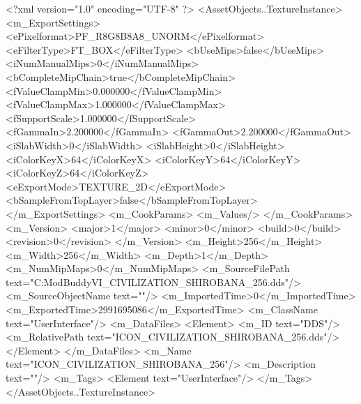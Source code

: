 <?xml version="1.0" encoding="UTF-8" ?>
<AssetObjects..TextureInstance>
	<m_ExportSettings>
		<ePixelformat>PF_R8G8B8A8_UNORM</ePixelformat>
		<eFilterType>FT_BOX</eFilterType>
		<bUseMips>false</bUseMips>
		<iNumManualMips>0</iNumManualMips>
		<bCompleteMipChain>true</bCompleteMipChain>
		<fValueClampMin>0.000000</fValueClampMin>
		<fValueClampMax>1.000000</fValueClampMax>
		<fSupportScale>1.000000</fSupportScale>
		<fGammaIn>2.200000</fGammaIn>
		<fGammaOut>2.200000</fGammaOut>
		<iSlabWidth>0</iSlabWidth>
		<iSlabHeight>0</iSlabHeight>
		<iColorKeyX>64</iColorKeyX>
		<iColorKeyY>64</iColorKeyY>
		<iColorKeyZ>64</iColorKeyZ>
		<eExportMode>TEXTURE_2D</eExportMode>
		<bSampleFromTopLayer>false</bSampleFromTopLayer>
	</m_ExportSettings>
	<m_CookParams>
		<m_Values/>
	</m_CookParams>
	<m_Version>
		<major>1</major>
		<minor>0</minor>
		<build>0</build>
		<revision>0</revision>
	</m_Version>
	<m_Height>256</m_Height>
	<m_Width>256</m_Width>
	<m_Depth>1</m_Depth>
	<m_NumMipMaps>0</m_NumMipMaps>
	<m_SourceFilePath text="C:\Users\asus\Documents\Firaxis ModBuddy\Civilization VI\temppic\ICON_CIVILIZATION_SHIROBANA_256.dds"/>
	<m_SourceObjectName text=""/>
	<m_ImportedTime>0</m_ImportedTime>
	<m_ExportedTime>2991695086</m_ExportedTime>
	<m_ClassName text="UserInterface"/>
	<m_DataFiles>
		<Element>
			<m_ID text="DDS"/>
			<m_RelativePath text="ICON_CIVILIZATION_SHIROBANA_256.dds"/>
		</Element>
	</m_DataFiles>
	<m_Name text="ICON_CIVILIZATION_SHIROBANA_256"/>
	<m_Description text=""/>
	<m_Tags>
		<Element text="UserInterface"/>
	</m_Tags>
</AssetObjects..TextureInstance>

